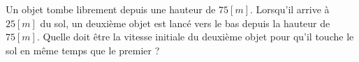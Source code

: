 \begin{exercise}
  Un objet tombe librement depuis une hauteur de \(75\unit{[m]}\). Lorsqu'il arrive à \(25 \unit{[m]}\) du sol, un deuxième objet est lancé vers le bas depuis la hauteur de \(75\unit{[m]}\). Quelle doit être la vitesse initiale du deuxième objet pour qu'il touche le sol en même temps que le premier ?
\end{exercise}
